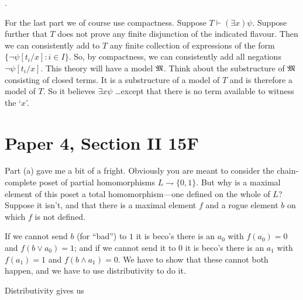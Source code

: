 \documentclass{book}
\begin{document}
.

For the last part we of course use compactness. Suppose $T \vdash
(\exists x)\psi$.  Suppose further that $T$ does not prove any finite
disjunction of the indicated flavour.  Then we can consistently add to
$T$ any finite collection of expressions of the form $\{\neg
\psi[t_i/x]: i \in I\}$.  So, by compactness, we can consistently add
all negations $\neg \psi[t_i/x]$.  This theory will have a model ${\mathfrak M}$.
Think about the substructure of ${\mathfrak M}$ consisting of closed terms.  It
is a substructure of a model of $T$ and is therefore a model of
$T$. So it believes $\exists x \psi$ \ldots except that there is no
term available to witness the `$x$'.

\section*{Paper 4, Section II 15F}

Part (a) gave me a bit of a fright.  Obviously you are meant to
consider the chain-complete poset of partial homomorphisms
$L\rightharpoondown \{0,1\}$.  But why is a maximal element of this
poset a total homomorphism---one defined on the whole of $L$?  Suppose
it isn't, and that there is a maximal element $f$ and a rogue element
$b$ on which $f$ is not defined.


If we cannot send $b$ (for ``bad'') to $1$ it is beco's there is an
$a_0$ with $f(a_0) = 0$ and $f(b\vee a_0) = 1$; and if we cannot send
it to $0$ it is beco's there is an $a_1$ with $f(a_1) = 1$ and
$f(b\wedge a_1) = 0$.  We have to show that these cannot both happen,
and we have to use distributivity to do it.

Distributivity gives us
\end{document}
